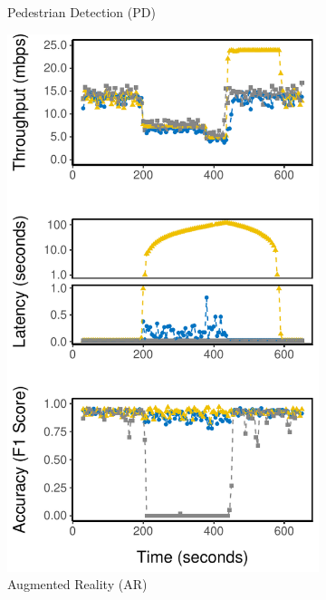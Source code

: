 \begin{figure}
\begin{subfigure}{0.3\textwidth}
    \caption{Pedestrian Detection (PD)}
    \label{fig:pd-runtime}
  \end{subfigure}
  \hfill
  \begin{subfigure}{0.3\textwidth}
    \centering
    \includegraphics[width=\textwidth]{figures/runtime-darknet-verticle.pdf}
    \caption{Augmented Reality (AR)}
    \label{fig:ar-runtime}
  \end{subfigure}
  \hfill
  \begin{subfigure}{0.3\textwidth}

\end{subfigure}
\end{figure}
